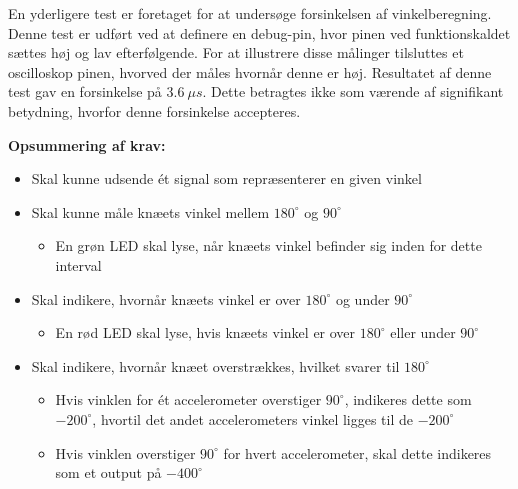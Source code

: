 \noindent
En yderligere test er foretaget for at undersøge forsinkelsen af vinkelberegning. Denne test er udført ved at definere en debug-pin, hvor pinen ved funktionskaldet sættes høj og lav efterfølgende. For at illustrere disse målinger tilsluttes et oscilloskop pinen, hvorved der måles hvornår denne er høj. Resultatet af denne test gav en forsinkelse på  $3.6~\mu s$. Dette betragtes ikke som værende af signifikant betydning, hvorfor denne forsinkelse accepteres.


\vspace{3mm}
\textbf{Opsummering af krav:}
\begin{itemize}
\item[\text{\sffamily \checkmark}] Skal kunne udsende ét signal som repræsenterer en given vinkel
\item[\text{\sffamily \checkmark}] Skal kunne måle knæets vinkel mellem $180^{\circ}$ og $90^{\circ}$
\begin{itemize}
\item En grøn LED skal lyse, når knæets vinkel befinder sig inden for dette interval
\end{itemize}
\item[\text{\sffamily \checkmark}] Skal indikere, hvornår knæets vinkel er over $180^{\circ}$ og under $90^{\circ}$
\begin{itemize}
\item En rød LED skal lyse, hvis knæets vinkel er over $180^{\circ}$ eller under $90^{\circ}$
\end{itemize}
\item[\text{\sffamily \checkmark}] Skal indikere, hvornår knæet overstrækkes, hvilket svarer til $180^{\circ}$
\begin{itemize}
\item Hvis vinklen for ét accelerometer overstiger $90^{\circ}$, indikeres dette som $-200^{\circ}$, hvortil det andet accelerometers vinkel ligges til de $-200^{\circ}$
\item Hvis vinklen overstiger $90^{\circ}$ for hvert accelerometer, skal dette indikeres som et output på $-400^{\circ}$
\end{itemize}
\end{itemize}